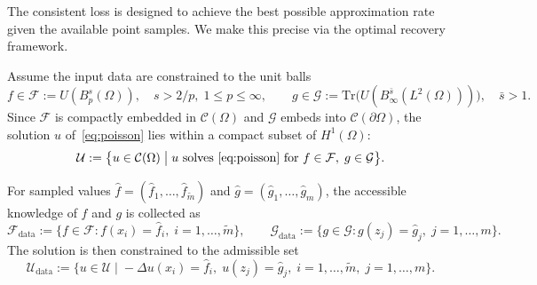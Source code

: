 \documentclass[11pt]{article}
\newcommand{\Omg}{\Omega}
\newcommand{\bOmg}{\partial\Omega}
\newcommand{\C}{\mathcal{C}}
\newcommand{\mtil}{\widetilde{m}}
\begin{document}
The consistent loss is designed to achieve the best possible
approximation rate given the available point samples. We make this
precise via the optimal recovery framework.
 
Assume the input data are constrained to the unit balls
\begin{equation}\label{eq:OR_classes}
  f \in \mathcal{F} := U(B^s_p(\Omg)),
  \quad s > 2/p,\;1\le p\le\infty,
  \qquad
  g \in \mathcal{G} := \mathrm{Tr}\bigl(
    U(B^{\bar{s}}_\infty(L^2(\Omg)))\bigr),
  \quad \bar{s} > 1.
\end{equation}
Since $\mathcal{F}$ is compactly embedded in $\C(\Omg)$
and $\mathcal{G}$ embeds into $\C(\bOmg)$,
the solution $u$ of~\eqref{eq:poisson} lies within a
compact subset of $H^1(\Omg)$:
\[
  \mathcal{U} := \bigl\{u \in \C(\Omg) \;\big|\;
    u \text{ solves \eqref{eq:poisson} for }
    f\in\mathcal{F},\; g\in\mathcal{G}\bigr\}.
\]
 
For sampled values
$\hat{f} = (\hat{f}_1,\ldots,\hat{f}_{\mtil})$ and
$\hat{g} = (\hat{g}_1,\ldots,\hat{g}_m)$,
the accessible knowledge of $f$ and $g$ is collected as
\[
  \mathcal{F}_{\mathrm{data}}
  := \{f\in\mathcal{F} : f(x_i) = \hat{f}_i,\;
       i=1,\ldots,\mtil\},
  \qquad
  \mathcal{G}_{\mathrm{data}}
  := \{g\in\mathcal{G} : g(z_j) = \hat{g}_j,\;
       j=1,\ldots,m\}.
\]
The solution is then constrained to the admissible set
\[
  \mathcal{U}_{\mathrm{data}}
  := \bigl\{u \in \mathcal{U}
    \;\big|\;
    -\Delta u(x_i) = \hat{f}_i,\;
    u(z_j) = \hat{g}_j,\;
    i=1,\ldots,\mtil,\;
    j=1,\ldots,m
  \bigr\}.
\]
 
\end{document}
